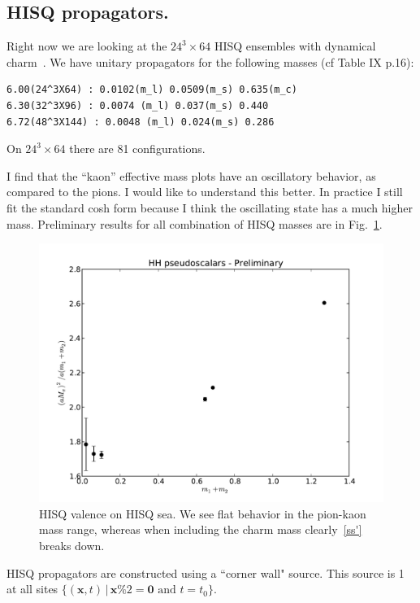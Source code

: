 \documentclass[11pt,a4paper]{article}
\begin{document}
\subsection{HISQ propagators.}
Right now we are looking at the $24^3 \times 64$ HISQ ensembles with dynamical charm~\cite{Bazavov:2012xda}.
We have unitary propagators for the following masses (cf  Table IX p.16):
\begin{verbatim}
6.00(24^3X64) : 0.0102(m_l) 0.0509(m_s) 0.635(m_c)
6.30(32^3X96) : 0.0074 (m_l) 0.037(m_s) 0.440
6.72(48^3X144) : 0.0048 (m_l) 0.024(m_s) 0.286
\end{verbatim}
On $24^3 \times 64$ there are 81 configurations.

I find that the ``kaon'' effective mass plots have an oscillatory behavior, as compared to 
the pions.  
I would like to understand this better.
In practice I still fit the standard cosh form because I think the oscillating state has a much higher mass. Preliminary results for all combination of HISQ masses are in Fig.~\ref{HH_pseudo}.%
\begin{figure}[h]
\centering
\includegraphics[width=\textwidth]{HH_pseudo}
\caption{HISQ valence on HISQ sea.  We see flat behavior in the pion-kaon mass range, whereas
when including the charm mass clearly~\ref{ss'} breaks down.}
\label{HH_pseudo}
\end{figure}

HISQ propagators are constructed using a ``corner wall" source.  This source is 1 at all sites
$\{ (\mathbf{x}, t) \, | \, \mathbf{x} \% 2 = \mathbf{0} \text{ and } t = t_0\}$.
\end{document}
